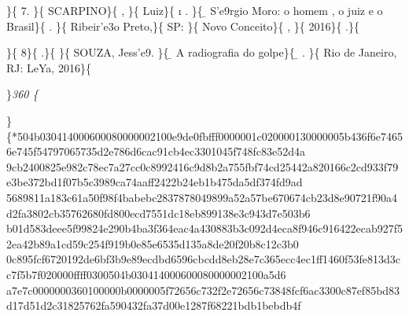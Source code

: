  \ltrch{}  \par \}\{\rtlch{}  \ltrch{}
 7. \}\{\rtlch{}  \ltrch{} 
SCARPINO\}\{\rtlch{}  \ltrch{}
 , \}\{\rtlch{}  \ltrch{}
 Luiz\}\{\rtlch{} \ai{} \ltrch{}
\i{} . \}\{\rtlch{} \ab{}
\ltrch{} \b{} S'e9rgio Moro: o homem , o juiz e o
Brasil\}\{\rtlch{}  \ltrch{} 
. \}\{\rtlch{}  \ltrch{}  Ribeir'e3o
Preto,\}\{\rtlch{}  \ltrch{} 
SP: \}\{\rtlch{}  \ltrch{}  Novo
Conceito\}\{\rtlch{}  \ltrch{}
 , \}\{\rtlch{}  \ltrch{}
 2016\}\{\rtlch{}  \ltrch{}
 .\}\{\rtlch{}  \ltrch{}
 \par \}\{\rtlch{}  \ltrch{} 
8\}\{\rtlch{}  \ltrch{}  .\}\{\rtlch{} 
\ltrch{}  \}\{\rtlch{}  \ltrch{}
 SOUZA, Jess'e9. \}\{\rtlch{} \ab{} \ltrch{}
\b{} A radiografia do
golpe\}\{\rtlch{} \ab{} \ltrch{} \b{} .
\}\{\rtlch{}  \ltrch{}  Rio
de Janeiro, RJ: LeYa, 2016\}\{\rtlch{}  \ltrch{}
\par \}\pard \ltrpar\qj {}\sl360\widctlpar\wrapdefault\aspalpha\aspnum\faauto\adjustright{} \{\rtlch{}
 \ltrch{} 
\par \}\{*\themedata 504b030414000600080000002100e9de0fbfff0000001c020000130000005b436f6e74656e745f54797065735d2e786d6cac91cb4ec3301045f748fc83e52d4a
9cb2400825e982c78ec7a27cc0c8992416c9d8b2a755fbf74cd25442a820166c2cd933f79e3be372bd1f07b5c3989ca74aaff2422b24eb1b475da5df374fd9ad
5689811a183c61a50f98f4babebc2837878049899a52a57be670674cb23d8e90721f90a4d2fa3802cb35762680fd800ecd7551dc18eb899138e3c943d7e503b6
b01d583deee5f99824e290b4ba3f364eac4a430883b3c092d4eca8f946c916422ecab927f52ea42b89a1cd59c254f919b0e85e6535d135a8de20f20b8c12c3b0
0c895fcf6720192de6bf3b9e89ecdbd6596cbcdd8eb28e7c365ecc4ec1ff1460f53fe813d3cc7f5b7f020000ffff0300504b030414000600080000002100a5d6
a7e7c0000000360100000b0000005f72656c732f2e72656c73848fcf6ac3300c87ef85bd83d17d51d2c31825762fa590432fa37d00e1287f68221bdb1bebdb4f

